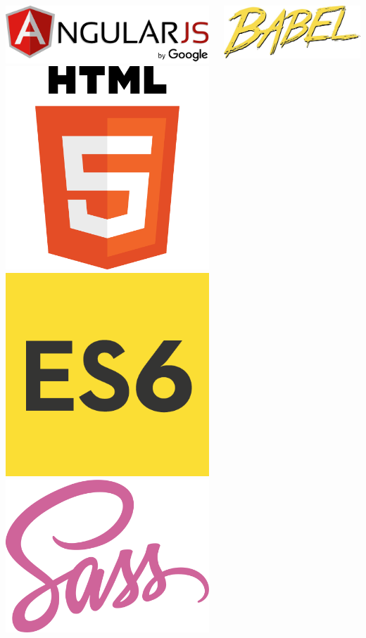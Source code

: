 \documentclass[aspectratio=169]{beamer}
\newenvironment{myframe}[1][t]{\begin{frame}[#1]{\secname}{\subsecname}}{\end{frame}}
\begin{document}
	\begin{myframe}
		\vspace{-2em}
		\noindent
		\begin{columns}[t]
			\begin{column}{0.3 \linewidth}
				\includegraphics[width=\linewidth]{images/technologies/angularjs}  \\[2em]
				\centering
				\includegraphics[width=0.25\linewidth]{images/technologies/html5} \hspace{0.12\linewidth}
				\includegraphics[width=0.25\linewidth]{images/technologies/es6} \hspace{0.12\linewidth}
				\includegraphics[width=0.25\linewidth]{images/technologies/sass}
			\end{column}
			\begin{column}{0.3 \linewidth}
				\includegraphics[width=0.70\linewidth]{images/technologies/babel} \hspace{0.75em}

\end{column}
\end{columns}
\end{myframe}
\end{document}
